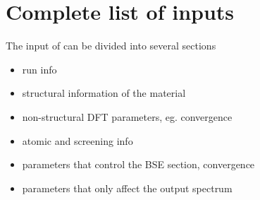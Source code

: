 \documentclass[11pt]{report}
\begin{document}
\section{Complete list of \OCEAN{} inputs}

The input of \OCEAN{} can be divided into several sections

\begin{itemize}
\item run info
\item structural information of the material
\item non-structural DFT parameters, eg. convergence
\item atomic and screening info
\item parameters that control the BSE section, convergence
\item parameters that only affect the output spectrum
\end{itemize}
\end{document}
